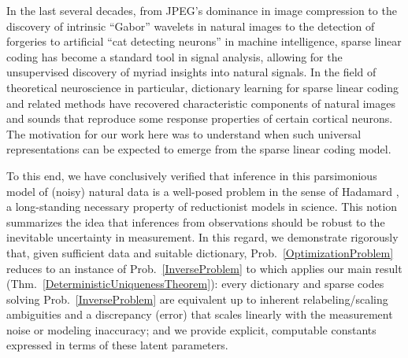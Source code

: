 \documentclass[9pt,twocolumn]{pnas-new}
\renewcommand{\eqref}[1]{\textnormal{[\ref{#1}]}}
\begin{document}
In the last several decades, from JPEG's dominance in image compression to the discovery of intrinsic ``Gabor'' wavelets in natural images \cite{donoho2001can} to the detection of forgeries \cite{hughes2010, Olshausen10} to artificial ``cat detecting neurons'' in machine intelligence, sparse linear coding has become a standard tool in signal analysis, allowing for the unsupervised discovery of myriad insights into natural signals. 
In the field of theoretical neuroscience in particular, dictionary learning for sparse linear coding and related methods have recovered characteristic components of natural images \cite{Olshausen96, hurri1996image, bell1997independent, van1998independent} and sounds \cite{bellsejnowski1996, smithlewicki2006, Carlson12} that reproduce some response properties of certain cortical neurons. The motivation for our work here was to understand when such universal representations can be expected to emerge from the sparse linear coding model. 

To this end, we have conclusively verified that inference in this parsimonious model of (noisy) natural data is a well-posed problem in the sense of Hadamard \cite{Hadamard1902}, a long-standing necessary property of reductionist models in science. This notion summarizes the idea that inferences from observations should be robust to the inevitable uncertainty in measurement. In this regard, we demonstrate rigorously that, given sufficient data and suitable dictionary, Prob.~\ref{OptimizationProblem} reduces to an instance of Prob.~\ref{InverseProblem} to which applies our main result (Thm.~\ref{DeterministicUniquenessTheorem}): every dictionary and sparse codes solving Prob.~\ref{InverseProblem} are equivalent up to inherent relabeling/scaling ambiguities and a discrepancy (error) that scales linearly with the measurement noise or modeling inaccuracy; and we provide explicit, computable constants expressed in terms of these latent parameters.
\end{document}
